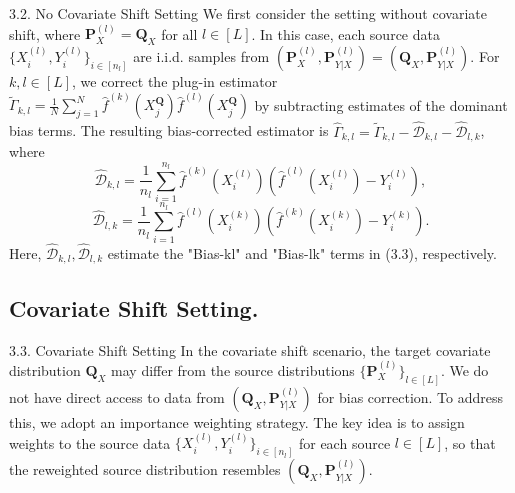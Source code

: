 \documentclass{beamer}
\begin{document}
\begin{frame}{3.2. No Covariate Shift Setting}
    We first consider the setting without covariate shift, where $\mathbf { P } _ { X } ^ { ( l ) } = \mathbf { Q } _ { X }$ for all $l \in [ L ]$. In this case, each source data $\{X _ {i} ^ {(l)}, Y _ {i} ^ {(l)}\}_{i\in[n_l]}$ are i.i.d. samples from $(\mathbf { P } _ { X } ^ { ( l ) } , \mathbf { P } _ { Y | X } ^ { ( l ) } ) = (\mathbf { Q } _ { X } , \mathbf { P } _ { Y | X } ^ { ( l ) } )$. For $k , l \in [ L ]$, we correct the plug-in estimator $\widetilde { \Gamma } _ { k , l } = \frac { 1 } { N } \sum _ { j = 1 } ^ { N } \widehat { f } ^ { ( k ) } ( X _ { j } ^ { \mathbf { Q } } ) \widehat { f } ^ { ( l ) } ( X _ { j } ^ { \mathbf { Q } } )$ by subtracting estimates of the dominant bias terms. The resulting bias-corrected estimator is $\widehat { \Gamma } _ { k , l } = \widetilde { \Gamma } _ { k , l } - \widehat { \mathcal { D } } _ { k , l } - \widehat { \mathcal { D } } _ { l , k }$, where
    $$
    \widehat {\mathcal {D}} _ {k, l} = \frac {1}{n _ {l}} \sum_ {i = 1} ^ {n _ {l}} \widehat {f} ^ {(k)} (X _ {i} ^ {(l)}) \left(\widehat {f} ^ {(l)} (X _ {i} ^ {(l)}) - Y _ {i} ^ {(l)}\right), 
    $$
    $$
    \widehat {\mathcal {D}} _ {l, k} = \frac {1}{n _ {l}} \sum_ {i = 1} ^ {n _ {l}} \widehat {f} ^ {(l)} (X _ {i} ^ {(k)}) \left(\widehat {f} ^ {(k)} (X _ {i} ^ {(k)}) - Y _ {i} ^ {(k)}\right).
    $$
    Here, $\widehat { \mathcal { D } } _ { k , l } , \widehat { \mathcal { D } } _ { l , k }$ estimate the "Bias-kl" and "Bias-lk" terms in (3.3), respectively.
\end{frame}

\subsection{Covariate Shift Setting.}

\begin{frame}{3.3. Covariate Shift Setting}
    In the covariate shift scenario, the target covariate distribution $\mathbf { Q } _ { X }$ may differ from the source distributions $\{ \mathbf { P } _ { X } ^ { ( l ) } \} _ { l \in [ L ] }$. We do not have direct access to data from $(\mathbf { Q } _ { X } , \mathbf { P } _ { Y | X } ^ { ( l ) } )$ for bias correction. To address this, we adopt an importance weighting strategy. The key idea is to assign weights to the source data $\{ X _ { i } ^ { ( l ) } , Y _ { i } ^ { ( l ) } \} _ { i \in [ n _ { l } ] }$ for each source $l \in [ L ]$, so that the reweighted source distribution resembles $(\mathbf { Q } _ { X } , \mathbf { P } _ { Y | X } ^ { ( l ) } )$.
\end{frame}
\end{document}
